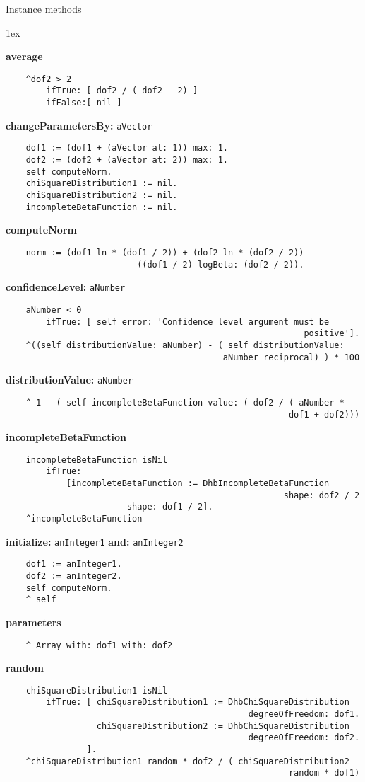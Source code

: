 Instance methods
{\parskip 1ex\par\noindent}
{\bf average}
\begin{verbatim}
    ^dof2 > 2
        ifTrue: [ dof2 / ( dof2 - 2) ]
        ifFalse:[ nil ]
\end{verbatim}
{\bf changeParametersBy:} {\tt aVector}
\begin{verbatim}
    dof1 := (dof1 + (aVector at: 1)) max: 1.
    dof2 := (dof2 + (aVector at: 2)) max: 1.
    self computeNorm.
    chiSquareDistribution1 := nil.
    chiSquareDistribution2 := nil.
    incompleteBetaFunction := nil.
\end{verbatim}
{\bf computeNorm}
\begin{verbatim}
    norm := (dof1 ln * (dof1 / 2)) + (dof2 ln * (dof2 / 2))
                        - ((dof1 / 2) logBeta: (dof2 / 2)).
\end{verbatim}
{\bf confidenceLevel:} {\tt aNumber}
\begin{verbatim}
    aNumber < 0
        ifTrue: [ self error: 'Confidence level argument must be 
                                                           positive'].
    ^((self distributionValue: aNumber) - ( self distributionValue: 
                                           aNumber reciprocal) ) * 100
\end{verbatim}
{\bf distributionValue:} {\tt aNumber}
\begin{verbatim}
    ^ 1 - ( self incompleteBetaFunction value: ( dof2 / ( aNumber * 
                                                        dof1 + dof2)))
\end{verbatim}
{\bf incompleteBetaFunction}
\begin{verbatim}
    incompleteBetaFunction isNil 
        ifTrue: 
            [incompleteBetaFunction := DhbIncompleteBetaFunction 
                                                       shape: dof2 / 2
                        shape: dof1 / 2].
    ^incompleteBetaFunction
\end{verbatim}
{\bf initialize:} {\tt anInteger1} {\bf and:} {\tt anInteger2}
\begin{verbatim}
    dof1 := anInteger1.
    dof2 := anInteger2.
    self computeNorm.
    ^ self
\end{verbatim}
{\bf parameters}
\begin{verbatim}
    ^ Array with: dof1 with: dof2
\end{verbatim}
{\bf random}
\begin{verbatim}
    chiSquareDistribution1 isNil
        ifTrue: [ chiSquareDistribution1 := DhbChiSquareDistribution 
                                                degreeOfFreedom: dof1.
                  chiSquareDistribution2 := DhbChiSquareDistribution 
                                                degreeOfFreedom: dof2.
                ].
    ^chiSquareDistribution1 random * dof2 / ( chiSquareDistribution2 
                                                        random * dof1)
\end{verbatim}
